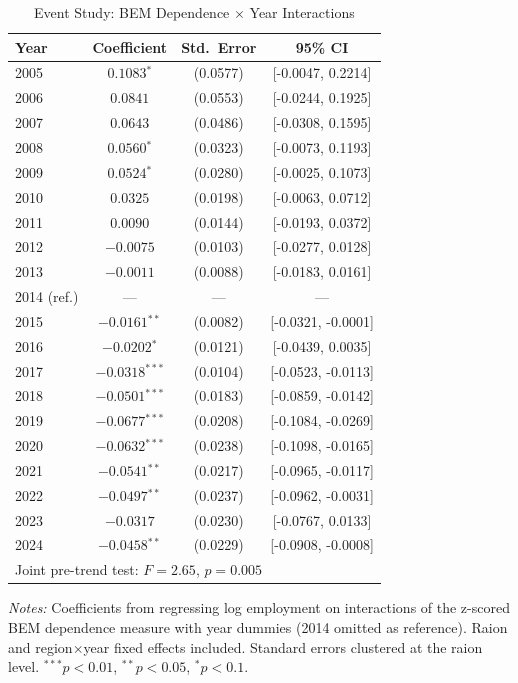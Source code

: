 \begin{table}[htbp]
\centering
\begin{threeparttable}
\caption{Event Study: BEM Dependence $\times$ Year Interactions}
\label{tab:event}
\begin{tabular}{lccc}
\hline\hline
Year & Coefficient & Std.\ Error & 95\% CI \\
\hline
2005 & $0.1083$$^{*}$ & (0.0577) & [-0.0047, 0.2214] \\
2006 & $0.0841$ & (0.0553) & [-0.0244, 0.1925] \\
2007 & $0.0643$ & (0.0486) & [-0.0308, 0.1595] \\
2008 & $0.0560$$^{*}$ & (0.0323) & [-0.0073, 0.1193] \\
2009 & $0.0524$$^{*}$ & (0.0280) & [-0.0025, 0.1073] \\
2010 & $0.0325$ & (0.0198) & [-0.0063, 0.0712] \\
2011 & $0.0090$ & (0.0144) & [-0.0193, 0.0372] \\
2012 & $-0.0075$ & (0.0103) & [-0.0277, 0.0128] \\
2013 & $-0.0011$ & (0.0088) & [-0.0183, 0.0161] \\
2014 (ref.) & --- & --- & --- \\
2015 & $-0.0161$$^{**}$ & (0.0082) & [-0.0321, -0.0001] \\
2016 & $-0.0202$$^{*}$ & (0.0121) & [-0.0439, 0.0035] \\
2017 & $-0.0318$$^{***}$ & (0.0104) & [-0.0523, -0.0113] \\
2018 & $-0.0501$$^{***}$ & (0.0183) & [-0.0859, -0.0142] \\
2019 & $-0.0677$$^{***}$ & (0.0208) & [-0.1084, -0.0269] \\
2020 & $-0.0632$$^{***}$ & (0.0238) & [-0.1098, -0.0165] \\
2021 & $-0.0541$$^{**}$ & (0.0217) & [-0.0965, -0.0117] \\
2022 & $-0.0497$$^{**}$ & (0.0237) & [-0.0962, -0.0031] \\
2023 & $-0.0317$ & (0.0230) & [-0.0767, 0.0133] \\
2024 & $-0.0458$$^{**}$ & (0.0229) & [-0.0908, -0.0008] \\
\hline
\multicolumn{4}{l}{Joint pre-trend test: $F = 2.65$, $p = 0.005$} \\
\hline\hline
\end{tabular}
\begin{tablenotes}[flushleft]\small
\item \textit{Notes:} Coefficients from regressing log employment on interactions of the z-scored BEM dependence measure with year dummies (2014 omitted as reference). Raion and region$\times$year fixed effects included. Standard errors clustered at the raion level. $^{***}p<0.01$, $^{**}p<0.05$, $^{*}p<0.1$.
\end{tablenotes}
\end{threeparttable}
\end{table}
